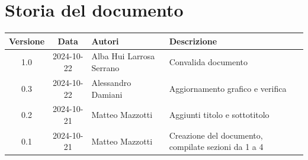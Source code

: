 \documentclass[10pt]{article}
\begin{document}
    \section{Storia del documento}
    \begin{center}
        \begin{tabular}{ c c p{3.90cm} p{5cm} }
            \rowcolor{gray!20}\rule{0pt}{0.5cm}\textbf{Versione} & \textbf{Data} & \textbf{Autori} & \textbf{Descrizione} \\[0.7ex]
            \hline
            \rule{0pt}{0.5cm}1.0 & 2024-10-22 & Alba Hui Larrosa Serrano & Convalida documento\\[0.7ex]
            \hline
            \rule{0pt}{0.5cm}0.3 & 2024-10-22 & Alessandro Damiani & Aggiornamento grafico e verifica\\[0.7ex]
            \hline
            \rule{0pt}{0.5cm}0.2 & 2024-10-21  & Matteo Mazzotti & Aggiunti titolo e sottotitolo\\[0.7ex]
            \hline
            \rule{0pt}{0.5cm}0.1 & 2024-10-21 & Matteo Mazzotti & Creazione del documento, compilate sezioni da 1 a 4\\[0.7ex]
        \end{tabular}
\end{center}
\end{document}
